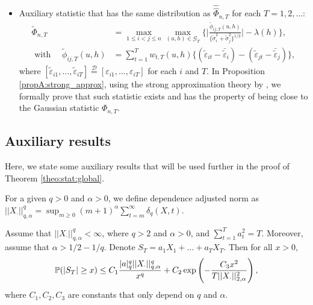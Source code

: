 \documentclass[a4paper,12pt]{article}
\newcommand{\doublehattwo}[1]{\widehat{\widehat{#1}}}
\begin{document}
\begin{itemize}
\item Auxiliary statistic that has the same distribution as $\doublehattwo{\Phi}_{n, T}$ for each $T = 1, 2, \ldots$: 
\begin{align*}
\widetilde{\Phi}_{n,T} &= \max_{1 \le i < j \le n}  \max_{(u,h) \in \mathcal{G}_T} \Bigg\{ \bigg|\frac{\widetilde{\phi}_{ij, T}(u,h)}{\{\widetilde{\sigma}_i^2 + \widetilde{\sigma}_j^2 \}^{1/2}} \bigg| - \lambda(h)\Bigg\}, \\
   \text{ with  } \quad  \widetilde{\phi}_{ij, T}(u,h) &= \sum\nolimits_{t=1}^T w_{t,T}(u,h) \big\{ (\widetilde{\varepsilon}_{it} - \bar{\widetilde{\varepsilon}}_i)  - (\widetilde{\varepsilon}_{jt} - \bar{\widetilde{\varepsilon}}_j)\big\},
  \end{align*}
where $[\widetilde{\varepsilon}_{i1},\ldots,\widetilde{\varepsilon}_{iT}] \stackrel{\mathcal{D}}{=} [\varepsilon_{i1},\ldots,\varepsilon_{iT}]$ for each $i$ and $T$. In Proposition \ref{propA:strong_approx}, using the strong approximation theory by \cite{BerkesLiuWu2014}, we formally prove that such statistic exists and has the property of being close to the Gaussian statistic $\Phi_{n,T}$.

\end{itemize}

\subsection{Auxiliary results}\label{subsec:appendix:aux}

Here, we state some auxiliary results that will be used further in the proof of Theorem \ref{theo:stat:global}.

\begin{definitionA}\label{defA-DAN} For a given $q > 0$ and $\alpha > 0$, we define dependence adjusted norm as 
$||X_{\cdot}||^{q}_{q, \alpha} = \sup_{m\geq 0} (m+1)^{\alpha} \sum_{t=m}^{\infty} \delta_{q}(X, t)$.
\end{definitionA}

\begin{theoremA}{\cite{Wu2016}}\label{theo-wu}
Assume that $||X_{\cdot}||^{q}_{q, \alpha} < \infty$, where $q > 2$ and $\alpha >0$, and $\sum_{t=1}^T a_t^2 = T.$ Moreover, assume that $\alpha > 1/2 - 1/q$. Denote \linebreak $S_T = a_1 X_1 + \ldots + a_T X_T$. Then for all $x>0$,
\begin{align*}
	\mathbb{P}(|S_T| \geq x) \leq C_1 \frac{|a|_{q}^{q}||X_{\cdot}||^{q}_{q, \alpha}  }{x^{q}} + C_2 \exp \left( - \frac{C_3 x^2} {T ||X_\cdot||^2_{2, \alpha}}\right),
\end{align*}
where $C_1, C_2, C_3$ are constants that only depend on $q$ and $\alpha$.
\end{theoremA}
\end{document}
